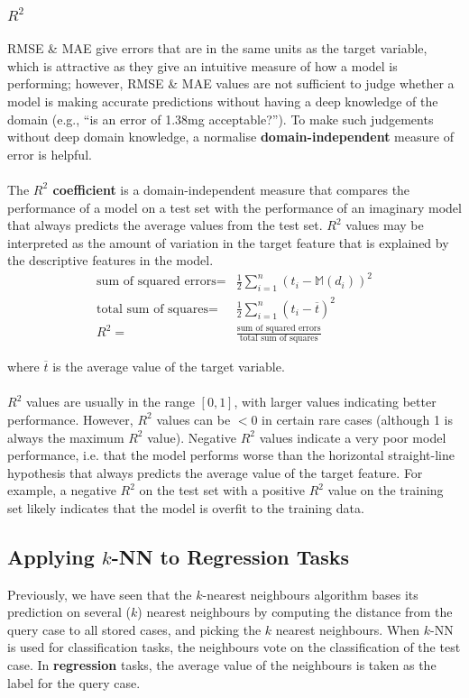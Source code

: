 \documentclass[a4paper,11pt]{article}
\begin{document}
\subsubsection{$R^2$}
RMSE \& MAE give errors that are in the same units as the target variable, which is attractive as they give an intuitive measure of how a model is performing; however, RMSE \& MAE values are not sufficient to judge whether a model is making accurate predictions without having a deep knowledge of the domain (e.g., ``is an error of 1.38mg acceptable?'').
To make such judgements without deep domain knowledge, a normalise \textbf{domain-independent} measure of error is helpful.
\\\\
The \textbf{$R^2$ coefficient} is a domain-independent measure that compares the performance of a model on a test set with the performance of an imaginary model that always predicts the average values from the test set.
$R^2$ values may be interpreted as the amount of variation in the target feature that is explained by the descriptive features in the model.
\begin{align*}
    \text{sum of squared errors} =& \frac{1}{2} \sum^n_{i=1} \left( t_i - \mathbb{M} \left( d_i \right) \right)^2 \\
    \text{total sum of squares} =& \frac{1}{2} \sum^n_{i=1} \left( t_i - \overline{t} \right)^2 \\
    R^2 =& \frac{\text{sum of squared errors}}{\text{total sum of squares}}
\end{align*}

where $\overline{t}$ is the average value of the target variable.
\\\\
$R^2$ values are usually in the range $[0,1]$, with larger values indicating better performance.
However, $R^2$ values can be $< 0$ in certain rare cases (although 1 is always the maximum $R^2$ value).
Negative $R^2$ values indicate a very poor model performance, i.e. that the model performs worse than the horizontal straight-line hypothesis that always predicts the average value of the target feature.
For example, a negative $R^2$ on the test set with a positive $R^2$ value on the training set likely indicates that the model is overfit to the training data.

\subsection{Applying $k$-NN to Regression Tasks}
Previously, we have seen that the $k$-nearest neighbours algorithm bases its prediction on several ($k$) nearest neighbours by computing the distance from the query case to all stored cases, and picking the $k$ nearest neighbours.
When $k$-NN is used for classification tasks, the neighbours vote on the classification of the test case.
In \textbf{regression} tasks, the average value of the neighbours is taken as the label for the query case.
\end{document}
